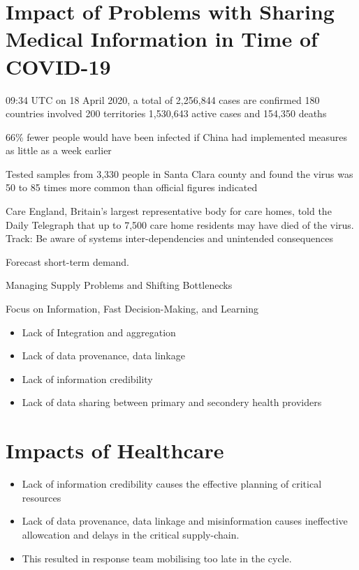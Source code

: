 {\color{red}{VJ:
Section 3 - Impact of Problems with Sharing Medical Information in Time of COVID-19: Here we elaborate what the problem is. This is a more detailed description of the problem, probably with more graphs.
}}

\section{Impact of Problems with Sharing Medical Information in Time of COVID-19}

{\color{red}{AFV:
We need some extra references and background here
}}

09:34 UTC on 18 April 2020, a total of 2,256,844 cases are confirmed
180 countries involved
200 territories
1,530,643 active cases and 154,350 deaths

66\% fewer people would have been infected if China had implemented measures as little as a week earlier

Tested samples from 3,330 people in Santa Clara county and found the virus was 50 to 85 times more common than official figures indicated

Care England, Britain’s largest representative body for care homes, told the Daily Telegraph that up to 7,500 care home residents may have died of the virus.
Track:
Be aware of systems inter-dependencies and unintended consequences

Forecast short-term demand.

Managing Supply Problems and Shifting Bottlenecks

Focus on Information, Fast Decision-Making, and Learning

\cite{Fox2010}
\cite{Matthias2016}

\cite{Costa2017}

\cite{Graban2018}

\begin{itemize}
    \item Lack of Integration and aggregation
    \item Lack of data provenance, data linkage
    \item Lack of information credibility
    \item Lack of data sharing between primary and secondery health providers
\end{itemize}

\section{Impacts of Healthcare}


\begin{itemize}
    \item Lack of information credibility causes the effective planning of critical resources
    \item Lack of data provenance, data linkage and misinformation causes ineffective allowcation and delays in the critical supply-chain.
    \item This resulted in response team mobilising too late in the cycle.
\end{itemize}

